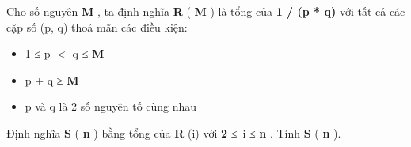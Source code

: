 Cho số nguyên   \textbf{    M   }   , ta định nghĩa   \textbf{    R   }   (   \textbf{    M   }   ) là tổng của   \textbf{    1 / (p * q)   }   với tất cả các cặp số (p, q) thoả mãn các điều kiện:  
\begin{itemize}
	\item     1 ≤ p $<$ q ≤    \textbf{     M    }
	\item     p + q ≥    \textbf{     M    }
	\item     p và q là 2 số nguyên tố cùng nhau   
\end{itemize}

   Định nghĩa   \textbf{    S   }   (   \textbf{    n   }   ) bằng tổng của   \textbf{    R   }   (i) với   \textbf{    2   }   ≤ i ≤   \textbf{    n   }   . Tính   \textbf{    S   }   (   \textbf{    n   }   ).